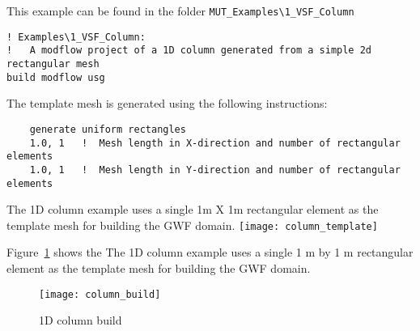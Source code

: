 \label{section:1d_column_example}
This example can be found in the folder \verb+MUT_Examples\1_VSF_Column+
\begin{verbatim}
! Examples\1_VSF_Column:
!   A modflow project of a 1D column generated from a simple 2d rectangular mesh
build modflow usg
\end{verbatim}
The template mesh is generated using the following instructions:
\begin{verbatim}
    generate uniform rectangles
    1.0, 1   !  Mesh length in X-direction and number of rectangular elements
    1.0, 1   !  Mesh length in Y-direction and number of rectangular elements
\end{verbatim}


The 1D column example uses a single 1m X 1m rectangular element as the template mesh for building the GWF domain.
    \texttt{[image: column\_template]}



Figure~\ref{fig:1D_Build} shows the The 1D column example uses a single 1 m by 1 m rectangular element as the template mesh for building the GWF domain.
\begin{figure}
    \texttt{[image: column\_build]}
    \caption{1D column build} \label{fig:1D_Build}
\end{figure}
